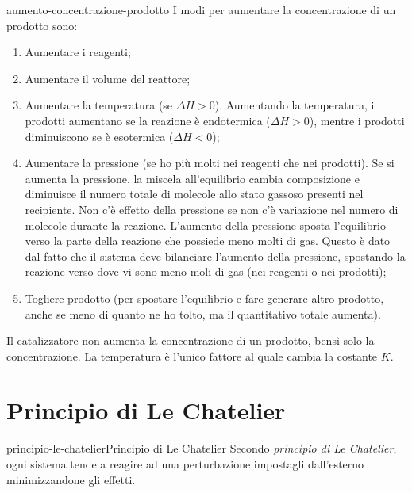 \documentclass[preview]{standalone}
\begin{document}
\begin{snippet}{aumento-concentrazione-prodotto}
    I modi per aumentare la concentrazione di un prodotto sono:
\begin{enumerate}
    \item Aumentare i reagenti;
    \item Aumentare il volume del reattore;
    \item Aumentare la temperatura (se \(\Delta H > 0\)).
        Aumentando la temperatura,
        i prodotti aumentano se la reazione è endotermica (\(\Delta H > 0\)),
        mentre i prodotti diminuiscono se è esotermica (\(\Delta H < 0\));
    \item Aumentare la pressione (se ho più molti nei reagenti che nei prodotti).
        Se si aumenta la pressione, la miscela all'equilibrio
        cambia composizione e diminuisce il numero totale di molecole allo stato gassoso presenti nel recipiente.
        Non c'è effetto della pressione
        se non c'è variazione nel numero di molecole durante la reazione.
        L'aumento della pressione sposta l'equilibrio verso la parte della reazione che possiede meno molti di gas.
        Questo è dato dal fatto che il sistema deve bilanciare l'aumento della pressione, spostando
        la reazione verso dove vi sono meno moli di gas (nei reagenti o nei prodotti);
    \item Togliere prodotto (per spostare l'equilibrio e fare generare altro prodotto, anche se meno di quanto ne ho tolto,
        ma il quantitativo totale aumenta).
\end{enumerate}

Il catalizzatore non aumenta la concentrazione di un prodotto, bensì solo la concentrazione.
La temperatura è l'unico fattore al quale cambia la costante \(K\).
\end{snippet}

\section{Principio di Le Chatelier}

\begin{snippetdefinition}{principio-le-chatelier}{Principio di Le Chatelier}
    Secondo \textit{principio di Le Chatelier},
    ogni sistema tende a reagire ad una perturbazione impostagli
    dall'esterno minimizzandone gli effetti.
\end{snippetdefinition}
\end{document}

